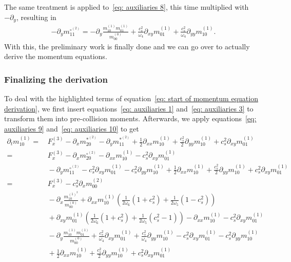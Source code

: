 The same treatment is applied to~\eqref{eq: auxiliaries 8}, this time multiplied with $-\partial_y$, resulting in
\begin{align}
  \label{eq: auxiliaries 10}
  -\partial_y m_{11}^{\circ^{(2)}}
  =
  -\partial_y \frac{ m_{10}^{(1)}m_{01}^{(1)}}{m_{00}^{(0)}}
  + \frac{c_s^2}{\omega_4}\partial_{xy} m_{01}^{(1)}
  + \frac{c_s^2}{\omega_4}\partial_{yy} m_{10}^{(1)}
  .
\end{align}
With this, the preliminary work is finally done and we can go over to actually derive the momentum equations.

\subsubsection{Finalizing the derivation}
\label{subs:Finalizing the derivation}
To deal with the highlighted terms of equation~\eqref{eq: start of momentum equation derivation}, we first insert equations~\eqref{eq: auxiliaries 1} and~\eqref{eq: auxiliaries 3} to transform them into pre-collision moments.
Afterwards, we apply equations~\eqref{eq: auxiliaries 9} and~\eqref{eq: auxiliaries 10} to get
\begin{align}
  \nonumber
  \partial_t m_{10}^{(1)} =&\,
  F_x^{(3)}
  - \partial_x m_{20}^{*^{(2)}}
  - \partial_y m_{11}^{*^{(2)}}
  + \frac{1}{2}\partial_{xx} m_{10}^{(1)}
  + \frac{c_s^2}{2} \partial_{yy} m_{10}^{(1)} + c_s^2\partial_{xy} m_{01}^{(1)}
  \\\nonumber =&\,
  F_x^{(3)}
  - \partial_x m_{20}^{\circ^{(2)}}
  - \partial_{xx} m_{10}^{(1)}
  - c_s^2\partial_{xy} m_{01}^{(1)}
  \\\nonumber &\,
  - \partial_y m_{11}^{\circ^{(2)}}
  - c_s^2 \partial_{xy} m_{01}^{(1)}
  - c_s^2 \partial_{yy} m_{10}^{(1)}
  + \frac{1}{2}\partial_{xx} m_{10}^{(1)}
  + \frac{c_s^2}{2} \partial_{yy} m_{10}^{(1)} + c_s^2\partial_{xy} m_{01}^{(1)}
  \\\nonumber =&\,
  F_x^{(3)}
  - c_s^2 \partial_x  m_{00}^{(2)}
  \\\nonumber &\,
  - \partial_x\frac{ m_{10}^{{(1)}^2} }{m_{00}^{(0)}}
  + \partial_{xx} m_{10}^{(1)} \left(\frac{1}{2\omega_6}(1+c_s^2)
  + \frac{1}{2\omega_5} (1 - c_s^2)\right)
  \\\nonumber &\,
  + \partial_{xy} m_{01}^{(1)} \left(\frac{1}{2\omega_6}(1+c_s^2)
  + \frac{1}{2\omega_5} (c_s^2 - 1)\right)
  - \partial_{xx} m_{10}^{(1)}
  - c_s^2\partial_{xy} m_{01}^{(1)}
  \\\nonumber &\,
  -\partial_y \frac{ m_{10}^{(1)}m_{01}^{(1)}}{m_{00}^{(0)}}
  + \frac{c_s^2}{\omega_4}\partial_{xy} m_{01}^{(1)}
  + \frac{c_s^2}{\omega_4}\partial_{yy} m_{10}^{(1)}
  - c_s^2 \partial_{xy} m_{01}^{(1)}
  - c_s^2 \partial_{yy} m_{10}^{(1)}
  \\\nonumber &\,
  + \frac{1}{2}\partial_{xx} m_{10}^{(1)}
  + \frac{c_s^2}{2} \partial_{yy} m_{10}^{(1)} + c_s^2\partial_{xy} m_{01}^{(1)}
  \end{align}
